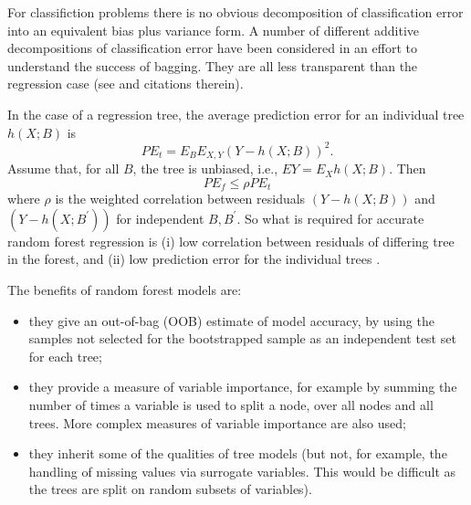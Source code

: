 \documentclass[10pt,letterpaper]{article}
\begin{document}
For classifiction problems there is no obvious decomposition of classification error into an equivalent bias plus
variance form. A number of different additive decompositions of classification error have been considered in an effort
to understand the success of bagging. They are all less transparent than the regression case (see \cite{Friedman.1997} and
citations therein).

In the case of a regression tree, the average prediction error for an individual tree $h(X; B)$ is
\begin{equation}
PE_t = E_B E_{X,Y} (Y-h(X; B))^2.
\end{equation}
Assume that, for all $B$, the tree is unbiased, i.e., $EY= E_X h(X; B)$. Then
\begin{equation}
PE_f \leq \rho PE_t
\end{equation}
where $\rho$ is the weighted correlation between residuals $(Y-h(X;B))$ and $(Y-h(X;B^\prime))$ for independent
$B,B^\prime$.
So what is required for accurate random forest regression is (i) low correlation between residuals of differing tree in
the forest, and (ii) low prediction error for the individual trees \cite{Segal.2004}. 

The benefits of random forest models are:
\begin{itemize}
\item they give an out-of-bag (OOB) estimate of model accuracy, by using the samples not selected for the bootstrapped sample
  as an independent test set for each tree;
\item they provide a measure of variable importance, for example by summing the number of times a variable is used to
  split a node, over all nodes and all trees. More complex measures of variable importance are also used;
\item they inherit some of the qualities of tree models (but not, for example, the handling of missing values via surrogate
  variables. This would be difficult as the trees are split on random subsets of variables).
\end{itemize}
\end{document}
